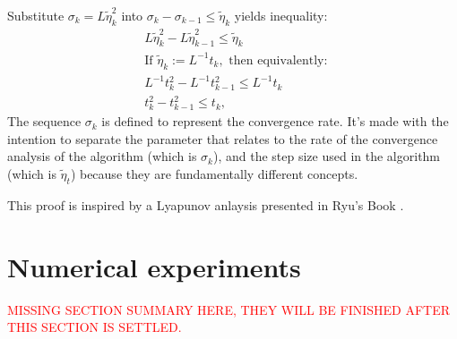 \documentclass[12pt]{article}
\begin{document}
    \begin{observation}
        Substitute $\sigma_k = L \tilde \eta_k^2$ into $\sigma_k - \sigma_{k - 1} \le \tilde \eta_k$ yields inequality:
        \begin{align*}
            & L \tilde \eta_k^2 - L \tilde \eta_{k - 1}^2 
            \le 
            \tilde \eta_k
            \\
            & \text{If }  \tilde \eta_k := L^{-1} t_k, \text{ then equivalently: }
            \\
            & L^{-1}t_k^2 - L^{-1}t_{k - 1}^2
            \le L^{-1}t_k 
            \\
            & 
            t_k^2 - t_{k - 1}^2
            \le t_k, 
        \end{align*}
        The sequence $\sigma_k$ is defined to represent the convergence rate. 
        It's made with the intention to separate the parameter that relates to the rate of the convergence analysis of the algorithm (which is $\sigma_k$), and the step size used in the algorithm (which is $\tilde \eta_t$) because they are fundamentally different concepts. 
    \end{observation}
    \begin{remark}
        This proof is inspired by a Lyapunov anlaysis presented in Ryu's Book \cite[Chapter 12]{ryu_large-scale_2022}. 
    \end{remark}

\section{Numerical experiments}\label{sec:numerical-experiments}
    \textcolor{red}{MISSING SECTION SUMMARY HERE, THEY WILL BE FINISHED AFTER THIS SECTION IS SETTLED.}
    
\end{document}
